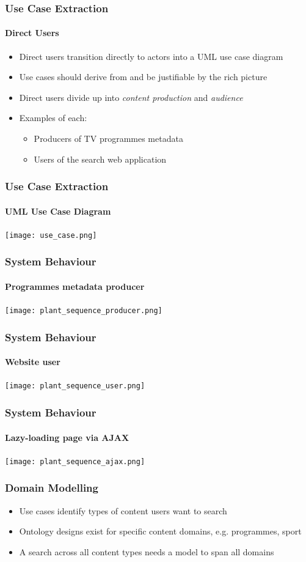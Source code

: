 \documentclass{beamer}
\begin{document}
\begin{frame}
  \frametitle{Use Case Extraction}
  \framesubtitle{Direct Users}
  \begin{itemize}
    \pause \item Direct users transition directly to actors into a UML use case diagram
    \pause \item Use cases should derive from and be justifiable by the rich picture
    \pause \item Direct users divide up into \emph{content production} and \emph{audience}
    \pause \item Examples of each:
    \begin{itemize}
      \pause \item Producers of TV programmes metadata
      \pause \item Users of the search web application
    \end{itemize}
  \end{itemize}
\end{frame}

\begin{frame}
  \frametitle{Use Case Extraction}
  \framesubtitle{UML Use Case Diagram}
  \pause \texttt{[image: use\_case.png]}
\end{frame}

\begin{frame}
  \frametitle{System Behaviour}
  \framesubtitle{Programmes metadata producer}
  \pause \texttt{[image: plant\_sequence\_producer.png]}
\end{frame}

\begin{frame}
  \frametitle{System Behaviour}
  \framesubtitle{Website user}
  \begin{center}
    \pause \texttt{[image: plant\_sequence\_user.png]}
  \end{center}
\end{frame}

\begin{frame}
  \frametitle{System Behaviour}
  \framesubtitle{Lazy-loading page via AJAX}
  \begin{center}
    \pause \texttt{[image: plant\_sequence\_ajax.png]}
  \end{center}
\end{frame}

\begin{frame}
  \frametitle{Domain Modelling}
  \begin{itemize}
    \pause \item Use cases identify types of content users want to search
    \pause \item Ontology designs exist for specific content domains, e.g. programmes, sport
    \pause \item A search across all content types needs a model to span all domains
  \end{itemize}
\end{frame}
\end{document}
